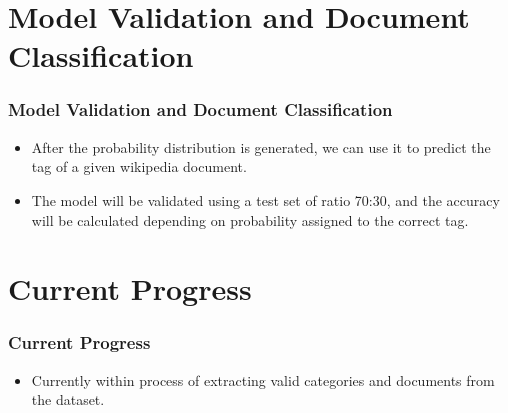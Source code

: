 \documentclass[
    10pt %
    16:9, %
]{beamer}
\begin{document}
\section{Model Validation and Document Classification}
\begin{frame}
  \frametitle{Model Validation and Document Classification}
  \begin{itemize}
    \item After the probability distribution is generated, we can use it to predict the tag of a given wikipedia document.
    \item The model will be validated using a test set of ratio 70:30, and the accuracy will be calculated depending on probability assigned to the correct tag.
  \end{itemize}
\end{frame}

\section{Current Progress}
\begin{frame}
  \frametitle{Current Progress}
  \begin{itemize}
    \item Currently within process of extracting valid categories and documents from the dataset.
  \end{itemize}
\end{frame}
\end{document}
